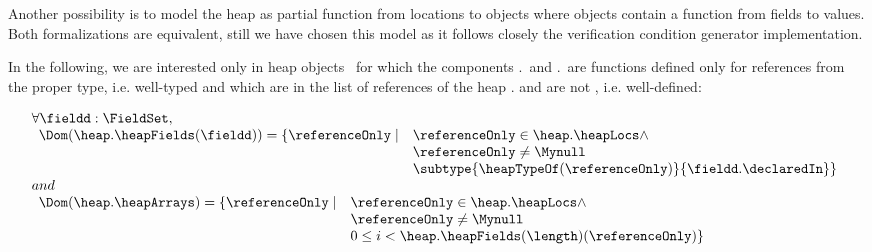  Another possibility is to model the heap as partial function from locations to objects where objects contain a function from 
 fields to values. Both formalizations are equivalent, still we have chosen this model as it follows closely the
 verification condition generator implementation.

 In the following, we are interested only in  heap objects \heap \ for which the components
 \heap.\heapFields \ and \heap.\heapArrays \ are functions defined only for references from the proper
 type, i.e. well-typed and which are in the list of references of the heap \heap.\heapLocs{} and are not \Mynull, i.e. well-defined: 

  $$\begin{array}{l}
           \forall  \fieldd : \FieldSet,   \\
   \begin{array}{ll} 
   \Dom( \heap.\heapFields(\fieldd))  =    \{ \referenceOnly \mid &	
                \referenceOnly  \in \heap.\heapLocs  \wedge \\
 	        &  \referenceOnly \neq \Mynull\\
  	        & \subtype{ \heapTypeOf(\referenceOnly ) }{\fieldd.\declaredIn} \}  
     \end{array}
	  \\
 	  and  \\
 	  \begin{array}{ll}  \Dom (\heap.\heapArrays) = \{  \referenceOnly \mid 	&  \referenceOnly  \in  \heap.\heapLocs \wedge \\ 
 	  &  \referenceOnly \neq \Mynull\\
 	  &  0 \leq i < \heap.\heapFields( \length)( \referenceOnly)   \}  
     \end{array}
 	 
    \end{array}
   $$

%	 


